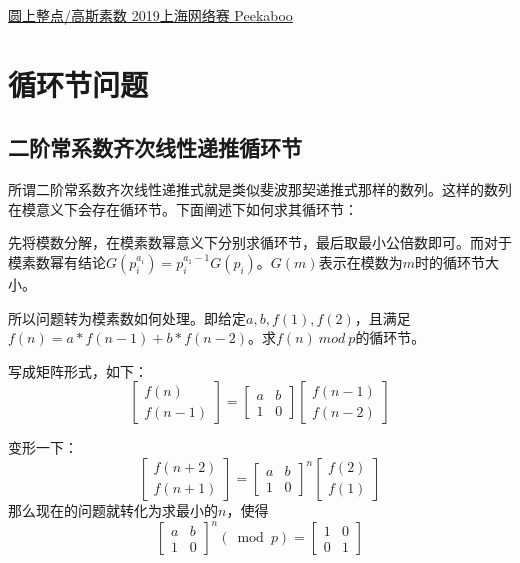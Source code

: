 \href{https://nanti.jisuanke.com/t/41421}{圆上整点/高斯素数 \quad 2019上海网络赛 Peekaboo}








\section{循环节问题}
\subsection{二阶常系数齐次线性递推循环节}
所谓二阶常系数齐次线性递推式就是类似斐波那契递推式那样的数列。这样的数列在模意义下会存在循环节。下面阐述下如何求其循环节：


先将模数分解，在模素数幂意义下分别求循环节，最后取最小公倍数即可。而对于模素数幂有结论$G(p_i^{a_i}) = p_i^{a_1-1}G(p_i)$。$G(m)$表示在模数为$m$时的循环节大小。

所以问题转为模素数如何处理。即给定$a,b,f(1),f(2)$，且满足$f(n)=a*f(n-1) + b*f(n-2)$。求$f(n)\ mod\ p$的循环节。

写成矩阵形式，如下：
$$
\left[\begin{array}{c}{f(n)} \\ {f(n-1)}\end{array}\right]=\left[\begin{array}{cc}{a} & {b} \\ {1} & {0}\end{array}\right]\left[\begin{array}{c}{f(n-1)} \\ {f(n-2)}\end{array}\right]
$$

变形一下：
$$
\left[\begin{array}{c}{f(n+2)} \\ {f(n+1)}\end{array}\right]=\left[\begin{array}{cc}{a} & {b} \\ {1} & {0}\end{array}\right]^{n}\left[\begin{array}{c}{f(2)} \\ {f(1)}\end{array}\right]
$$
那么现在的问题就转化为求最小的$n$，使得
$$
\left[\begin{array}{ll}{a} & {b} \\ {1} & {0}\end{array}\right]^{n}(\bmod p)=\left[\begin{array}{ll}{1} & {0} \\ {0} & {1}\end{array}\right]
$$

